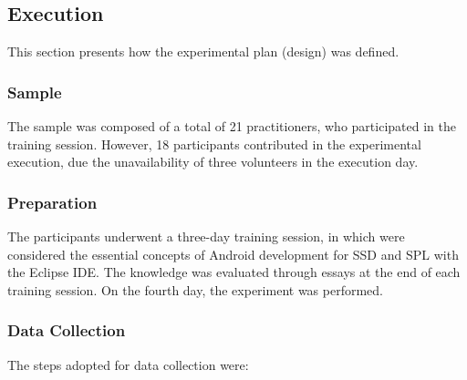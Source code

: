 \subsection{Execution}\label{sub:execution}

This section presents how the experimental plan (design) was defined.

\subsubsection*{Sample}

The sample was composed of a total of 21 practitioners, who participated in the training session. However, 18 participants contributed in the experimental execution, due the unavailability of three volunteers in the execution day.

\subsubsection*{Preparation}

The participants underwent a three-day training session, in which were considered the essential concepts of Android development for SSD and SPL with the Eclipse IDE. The knowledge was evaluated through essays at the end of each training session. On the fourth day, the experiment was performed.

\subsubsection*{Data Collection}

The steps adopted for data collection were:

